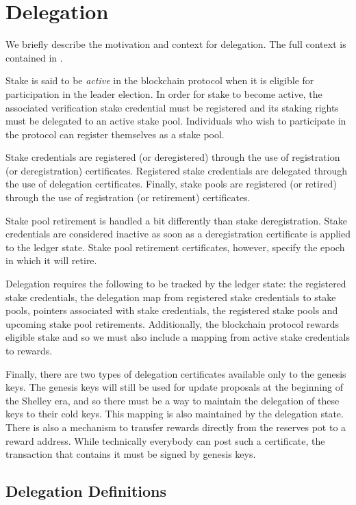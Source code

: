 \section{Delegation}
\label{sec:delegation-shelley}

We briefly describe the motivation and context for delegation.
The full context is contained in \cite{delegation_design}.

Stake is said to be \textit{active} in the blockchain protocol when it is
eligible for participation in the leader election. In order for stake to become
active, the associated verification stake credential must be registered and its
staking rights must be delegated to an active stake pool. Individuals who wish
to participate in the protocol can register themselves as a stake pool.

Stake credentials are registered (or deregistered) through the use of
registration (or deregistration) certificates. Registered stake credentials are
delegated through the use of delegation certificates.  Finally, stake pools are
registered (or retired) through the use of registration (or retirement)
certificates.

Stake pool retirement is handled a bit differently than stake deregistration.
Stake credentials are considered inactive as soon as a deregistration
certificate is applied to the ledger state.  Stake pool retirement certificates,
however, specify the epoch in which it will retire.

Delegation requires the following to be tracked by the ledger state: the
registered stake credentials, the delegation map from registered stake
credentials to stake pools, pointers associated with stake credentials, the
registered stake pools and upcoming stake pool retirements.  Additionally, the
blockchain protocol rewards eligible stake and so we must also include a mapping
from active stake credentials to rewards.

Finally, there are two types of delegation certificates available only to the
genesis keys. The genesis keys will still be used for update proposals at the
beginning of the Shelley era, and so there must be a way to maintain the delegation
of these keys to their cold keys.  This mapping is also maintained by the
delegation state. There is also a mechanism to transfer rewards directly from
the reserves pot to a reward address. While technically everybody can post such
a certificate, the transaction that contains it must be signed by genesis keys.

\subsection{Delegation Definitions}
\label{sec:deleg-defs}

